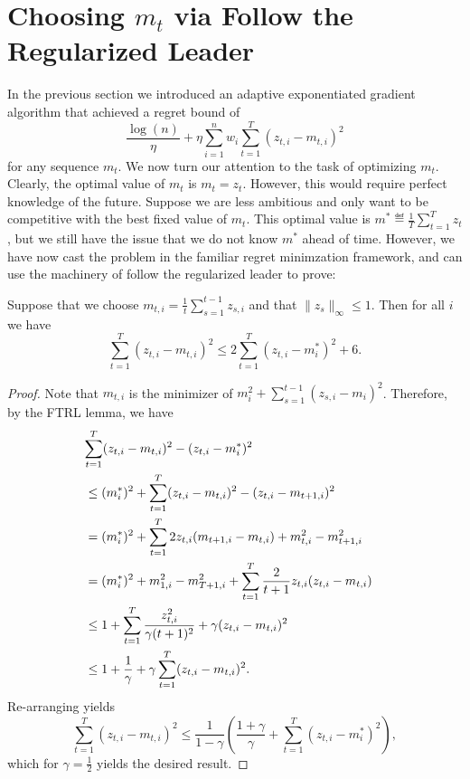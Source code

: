 \documentclass[paper_icml.tex]{subfiles}
\begin{document}
\section{Choosing $m_t$ via Follow the Regularized Leader} 
\label{sec:ftrl-aux}
In the previous section we introduced an adaptive exponentiated 
gradient algorithm that achieved a regret bound of 
\[ \frac{\log(n)}{\eta} + \eta \sum_{i=1}^n w_i \sum_{t=1}^T (z_{t,i} - m_{t,i})^2 \]
for any sequence $m_t$. We now turn our attention to the task of 
optimizing $m_t$. Clearly, the optimal value of $m_t$ is $m_t = z_t$. However, 
this would require perfect knowledge of the future. Suppose we are less ambitious 
and only want to be competitive with the best fixed value of $m_t$. This optimal value 
is $m^* \eqdef \frac{1}{T} \sum_{t=1}^T z_t$, but we still have the issue that 
we do not know $m^*$ ahead of time. However, we have now cast the problem in the familiar 
regret minimzation framework, and can use the machinery of follow the regularized 
leader \cite{hazan2011ftrl} to prove:
\begin{proposition}
\label{prop:ftrl-aux}
Suppose that we choose $m_{t,i} = \frac{1}{t} \sum_{s=1}^{t-1} z_{s,i}$ and that 
$\|z_s\|_{\infty} \leq 1$. Then for all $i$ we have
\[ \sum_{t=1}^T (z_{t,i} - m_{t,i})^2 \leq 2\sum_{t=1}^T (z_{t,i} - m^*_i)^2 + 6. \]
\end{proposition}
\begin{proof}
Note that $m_{t,i}$ is the minimizer of $m_i^2 + \sum_{s=1}^{t-1} (z_{s,i} - m_i)^2$. 
Therefore, by the FTRL lemma, we have
\begin{align*}
\lefteqn{\sum_{t=1}^T (z_{t,i}-m_{t,i})^2 - (z_{t,i} - m^*_i)^2} \\
 &\leq (m^*_i)^2 + \sum_{t=1}^T (z_{t,i}-m_{t,i})^2 - (z_{t,i} - m_{t+1,i})^2 \\
 &= (m^*_i)^2 + \sum_{t=1}^T 2z_{t,i}(m_{t+1,i}-m_{t,i}) + m_{t,i}^2 - m_{t+1,i}^2 \\
 &= (m^*_i)^2 + m_{1,i}^2 - m_{T+1,i}^2 + \sum_{t=1}^T \frac{2}{t+1}z_{t,i}(z_{t,i} - m_{t,i}) \\
 &\leq 1 + \sum_{t=1}^T \frac{z_{t,i}^2}{\gamma (t+1)^2} + \gamma(z_{t,i} - m_{t,i})^2 \\
 &\leq 1 + \frac{1}{\gamma} + \gamma \sum_{t=1}^T (z_{t,i} - m_{t,i})^2.
\end{align*}
Re-arranging yields
\begin{equation*}
\sum_{t=1}^T (z_{t,i} - m_{t,i})^2 \leq \frac{1}{1-\gamma}\left(\frac{1+\gamma}{\gamma} + \sum_{t=1}^T (z_{t,i} - m_i^*)^2\right),
\end{equation*}
which for $\gamma = \frac{1}{2}$ yields the desired result.
\end{proof}
\end{document}
